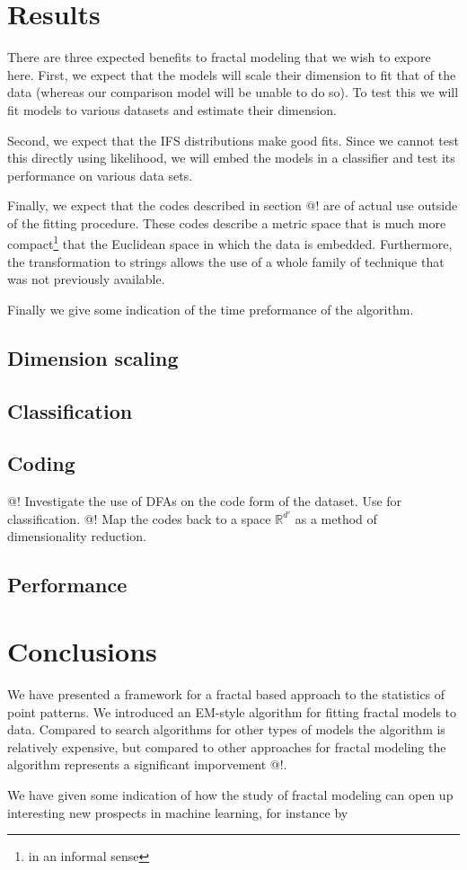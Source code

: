 \documentclass[11pt, twocolumn]{article}
\theoremstyle{definition}
\begin{document}
\section{Results}

There are three expected benefits to fractal modeling that we wish to expore here. First, we expect that the models will scale their dimension to fit that of the data (whereas our comparison model will be unable to do so). To test this we will fit models to various datasets and estimate their dimension. 

Second, we expect that the IFS distributions make good fits. Since we cannot test this directly using likelihood, we will embed the models in a classifier and test its performance on various data sets.

Finally, we expect that the codes described in section @! are of actual use outside of the fitting procedure. These codes describe a metric space that is much more compact\footnote{in an informal sense} that the Euclidean space in which the data is embedded. Furthermore, the transformation to strings allows the use of a whole family of technique that was not previously available.

Finally we give some indication of the time preformance of the algorithm.

\subsection{Dimension scaling}

\subsection{Classification}

\subsection{Coding}

@! Investigate the use of DFAs on the code form of the dataset. Use for classification.
@! Map the codes back to a space ${\mathbb R}^{d'}$ as a method of dimensionality reduction. 

\subsection{Performance}

\section{Conclusions}

We have presented a framework for a fractal based approach to the statistics of point patterns. We introduced an EM-style algorithm for fitting fractal models to data. Compared to search algorithms for other types of models the algorithm is relatively expensive, but compared to other approaches for fractal modeling the algorithm represents a significant imporvement @!. 

We have given some indication of how the study of fractal modeling can open up interesting new prospects in machine learning, for instance by 
\end{document}
